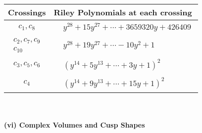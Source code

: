 \documentclass[1p]{elsarticle_modified}
\theoremstyle{definition}
\begin{document}
\begin{tabular}{m{50pt}|m{274pt}}
Crossings & \hspace{64pt}Riley Polynomials at each crossing \\
\hline $$\begin{aligned}c_{1},c_{8}\end{aligned}$$&$\begin{aligned}
&y^{28}+15 y^{27}+\cdots+3659320 y+426409
\end{aligned}$\\
\hline $$\begin{aligned}c_{2},c_{7},c_{9}\\c_{10}\end{aligned}$$&$\begin{aligned}
&y^{28}+19 y^{27}+\cdots-10 y^2+1
\end{aligned}$\\
\hline $$\begin{aligned}c_{3},c_{5},c_{6}\end{aligned}$$&$\begin{aligned}
&(y^{14}+5 y^{13}+\cdots+3 y+1)^{2}
\end{aligned}$\\
\hline $$\begin{aligned}c_{4}\end{aligned}$$&$\begin{aligned}
&(y^{14}+9 y^{13}+\cdots+15 y+1)^{2}
\end{aligned}$\\
\hline
\end{tabular}\\~\\
\newpage\flushleft \textbf{(vi) Complex Volumes and Cusp Shapes}
\end{document}
